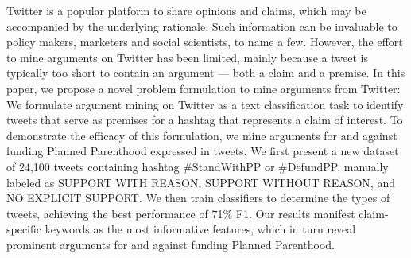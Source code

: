 Twitter is a popular platform to share opinions and claims, which may be accompanied by the underlying rationale. Such information can be invaluable to policy makers, marketers and social scientists, to name a few. However, the effort to mine arguments on Twitter has been limited, mainly because a tweet is typically too short to contain an argument — both a claim and a premise. In this paper, we propose a novel problem formulation to mine arguments from Twitter: We formulate argument mining on Twitter as a text classification task to identify tweets that serve as premises for a hashtag that represents a claim of interest. To demonstrate the efficacy of this formulation, we mine arguments for and against funding Planned Parenthood expressed in tweets. We first present a new dataset of 24,100 tweets containing hashtag \#StandWithPP or \#DefundPP, manually labeled as SUPPORT WITH REASON, SUPPORT WITHOUT REASON, and NO EXPLICIT SUPPORT. We then train classifiers to determine the types of tweets, achieving the best performance of 71\% F1. Our results manifest claim-specific keywords as the most informative features, which in turn reveal prominent arguments for and against funding Planned Parenthood.
